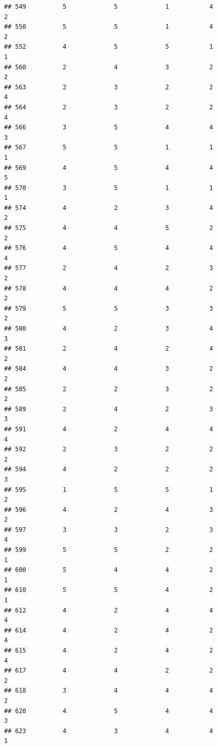 \documentclass[
]{article}
\begin{document}
\begin{verbatim}
## 549          5             5             1           4             2
## 550          5             5             1           4             2
## 552          4             5             5           1             1
## 560          2             4             3           2             2
## 563          2             3             2           2             4
## 564          2             3             2           2             4
## 566          3             5             4           4             3
## 567          5             5             1           1             1
## 569          4             5             4           4             5
## 570          3             5             1           1             1
## 574          4             2             3           4             2
## 575          4             4             5           2             2
## 576          4             5             4           4             4
## 577          2             4             2           3             2
## 578          4             4             4           2             2
## 579          5             5             3           3             2
## 580          4             2             3           4             3
## 581          2             4             2           4             2
## 584          4             4             3           2             2
## 585          2             2             3           2             2
## 589          2             4             2           3             3
## 591          4             2             4           4             4
## 592          2             3             2           2             2
## 594          4             2             2           2             3
## 595          1             5             5           1             2
## 596          4             2             4           3             2
## 597          3             3             2           3             4
## 599          5             5             2           2             1
## 600          5             4             4           2             1
## 610          5             5             4           2             1
## 612          4             2             4           4             4
## 614          4             2             4           2             4
## 615          4             2             4           2             4
## 617          4             4             2           2             2
## 618          3             4             4           4             2
## 620          4             5             4           4             3
## 623          4             3             4           4             1

\end{verbatim}
\end{document}
